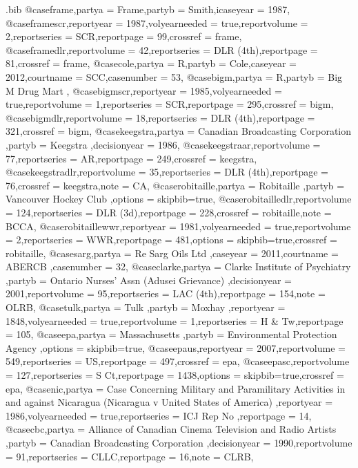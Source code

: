 \begin{filecontents*}[overwrite]{\jobname.bib}
@case{frame,partya = {Frame},partyb = {Smith},icaseyear = {1987},}
@case{framescr,reportyear = {1987},volyearneeded = {true},reportvolume = {2},reportseries = {SCR},reportpage = {99},crossref = {frame},}
@case{framedlr,reportvolume = {42},reportseries = {DLR (4th)},reportpage = {81},crossref = {frame},}
@case{cole,partya = {R},partyb = {Cole},caseyear = {2012},courtname = {SCC},casenumber = {53},}
@case{bigm,partya = {R},partyb = {Big M Drug Mart },}
@case{bigmscr,reportyear = {1985},volyearneeded = {true},reportvolume = {1},reportseries = {SCR},reportpage = {295},crossref = {bigm},}
@case{bigmdlr,reportvolume = {18},reportseries = {DLR (4th)},reportpage = {321},crossref = {bigm},}
@case{keegstra,partya = {Canadian Broadcasting Corporation },partyb = {Keegstra },decisionyear = {1986},}
@case{keegstraar,reportvolume = {77},reportseries = {AR},reportpage = {249},crossref = {keegstra},}
@case{keegstradlr,reportvolume = {35},reportseries = {DLR (4th)},reportpage = {76},crossref = {keegstra},note = {CA},}
@case{robitaille,partya = {Robitaille },partyb = {Vancouver Hockey Club },options = {skipbib=true},}
@case{robitailledlr,reportvolume = {124},reportseries = {DLR (3d)},reportpage = {228},crossref = {robitaille},note = {BCCA},}
@case{robitaillewwr,reportyear = {1981},volyearneeded = {true},reportvolume = {2},reportseries = {WWR},reportpage = {481},options = {skipbib=true},crossref = {robitaille},}
@case{sarg,partya = {Re Sarg Oils Ltd },caseyear = {2011},courtname = {ABERCB },casenumber = {32},}
@case{clarke,partya = {Clarke Institute of Psychiatry },partyb = {Ontario Nurses' Assn (Adusei Grievance) },decisionyear = {2001},reportvolume = {95},reportseries = {LAC (4th)},reportpage = {154},note = {OLRB},}
@case{tulk,partya = {Tulk },partyb = {Moxhay },reportyear = {1848},volyearneeded = {true},reportvolume = {1},reportseries = {H \& Tw},reportpage = {105},}
@case{epa,partya = {Massachusetts },partyb = {Environmental Protection Agency },options = {skipbib=true},}
@case{epaus,reportyear = {2007},reportvolume = {549},reportseries = {US},reportpage = {497},crossref = {epa},}
@case{epasc,reportvolume = {127},reportseries = {S Ct},reportpage = {1438},options = {skipbib=true},crossref = {epa},}
@case{nic,partya = {Case Concerning Military and Paramilitary Activities in and against Nicaragua (Nicaragua v United States of America) },reportyear = {1986},volyearneeded = {true},reportseries = {ICJ Rep No },reportpage = {14},}
@case{cbc,partya = {Alliance of Canadian Cinema Television and Radio Artists },partyb = {Canadian Broadcasting Corporation },decisionyear = {1990},reportvolume = {91},reportseries = {CLLC},reportpage = {16},note = {CLRB},}

\end{filecontents*}
